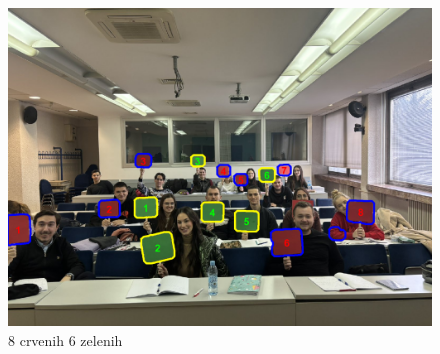 \documentclass[a4paper,12pt]{article}
\begin{document}
\begin{figure}
    \centering
    \includegraphics[width=\textwidth]{studenti.png}
    \caption{8 crvenih 6 zelenih}
    \label{fig:example}
\end{figure}
\end{document}
